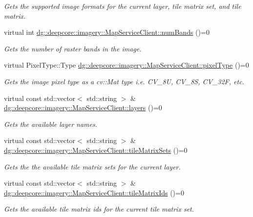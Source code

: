 \begin{DoxyCompactItemize}
\begin{DoxyCompactList}\small\item\em Gets the supported image formats for the current layer, tile matrix set, and tile matrix. \end{DoxyCompactList}\item 
virtual int \hyperlink{group___imagery_module_ga7b7d8333be9d5386d8ddca5148b041b5}{dg\+::deepcore\+::imagery\+::\+Map\+Service\+Client\+::num\+Bands} ()=0
\begin{DoxyCompactList}\small\item\em Gets the number of raster bands in the image. \end{DoxyCompactList}\item 
virtual Pixel\+Type\+::\+Type \hyperlink{group___imagery_module_gaac6e8dc94732e24fcc43bb8662990363}{dg\+::deepcore\+::imagery\+::\+Map\+Service\+Client\+::pixel\+Type} ()=0
\begin{DoxyCompactList}\small\item\em Gets the image pixel type as a cv\+::\+Mat type i.\+e. C\+V\+\_\+8U, C\+V\+\_\+8S, C\+V\+\_\+32F, etc. \end{DoxyCompactList}\item 
virtual const std\+::vector$<$ std\+::string $>$ \& \hyperlink{group___imagery_module_ga51617c7aeaf00918210d64aaf5712d4e}{dg\+::deepcore\+::imagery\+::\+Map\+Service\+Client\+::layers} ()=0
\begin{DoxyCompactList}\small\item\em Gets the available layer names. \end{DoxyCompactList}\item 
virtual const std\+::vector$<$ std\+::string $>$ \& \hyperlink{group___imagery_module_ga1cf271559e56836cf29176382c934a0c}{dg\+::deepcore\+::imagery\+::\+Map\+Service\+Client\+::tile\+Matrix\+Sets} ()=0
\begin{DoxyCompactList}\small\item\em Gets the the available tile matrix sets for the current layer. \end{DoxyCompactList}\item 
virtual const std\+::vector$<$ std\+::string $>$ \& \hyperlink{group___imagery_module_ga2e5ad607fa13ac17e0fcb6b00af7d30e}{dg\+::deepcore\+::imagery\+::\+Map\+Service\+Client\+::tile\+Matrix\+Ids} ()=0
\begin{DoxyCompactList}\small\item\em Gets the available tile matrix ids for the current tile matrix set. \end{DoxyCompactList}\item 

\end{DoxyCompactItemize}
